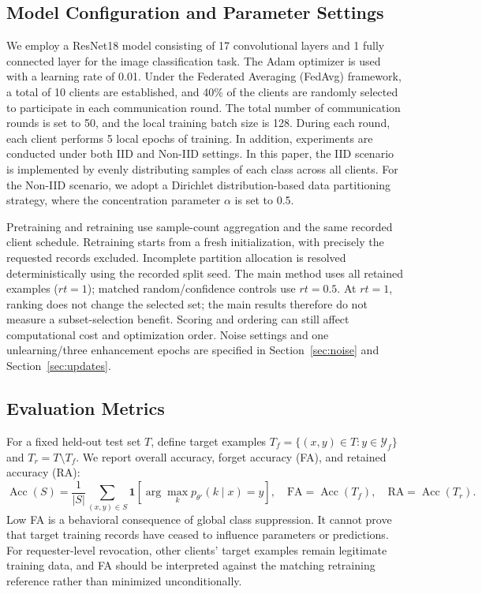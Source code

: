 \documentclass[software,article,submit,moreauthors]{Definitions/mdpi}
\begin{document}
\subsection{Model Configuration and Parameter Settings}


We employ a ResNet18 model consisting of 17 convolutional layers and 1 fully
connected layer for the image classification task. The Adam optimizer is used
with a learning rate of 0.01. Under the Federated Averaging (FedAvg) framework,
a total of 10 clients are established, and 40\% of the clients are randomly
selected to participate in each communication round. The total number of
communication rounds is set to 50, and the local training batch size is 128.
During each round, each client performs 5 local epochs of training. In addition,
experiments are conducted under both IID and Non-IID settings. In this paper,
the IID scenario is implemented by evenly distributing samples of each class
across all clients. For the Non-IID scenario, we adopt a Dirichlet
distribution-based data partitioning strategy, where the concentration parameter
$\alpha$ is set to 0.5.


Pretraining and retraining use sample-count aggregation and the same recorded
client schedule. Retraining starts from a fresh initialization, with precisely
the requested records excluded. Incomplete partition allocation is resolved
deterministically using the recorded split seed.
The main method uses all retained examples ($rt=1$); matched random/confidence
controls use $rt=0.5$. At $rt=1$, ranking does not change the selected set;
the main results therefore do not measure a subset-selection benefit. Scoring
and ordering can still affect computational cost and optimization order.
Noise settings and one unlearning/three enhancement epochs are specified in
Section~\ref{sec:noise} and Section~\ref{sec:updates}.

\subsection{Evaluation Metrics}
\label{sec:metrics}
For a fixed held-out test set $T$, define target examples
$T_f=\{(x,y)\in T:y\in\mathcal{Y}_f\}$ and $T_r=T\setminus T_f$. We report
overall accuracy, forget accuracy (FA), and retained accuracy (RA):
\begin{equation}
\operatorname{Acc}(S)=\frac{1}{|S|}\sum_{(x,y)\in S}
\mathbf{1}[\arg\max_k p_{\theta'}(k\mid x)=y],\quad
\mathrm{FA}=\operatorname{Acc}(T_f),\quad\mathrm{RA}=\operatorname{Acc}(T_r).
\end{equation}
Low FA is a behavioral consequence of global class suppression. It cannot prove
that target training records have ceased to influence parameters or predictions.
For requester-level revocation, other clients' target examples remain legitimate
training data, and FA should be interpreted against the matching retraining
reference rather than minimized unconditionally.
\end{document}
